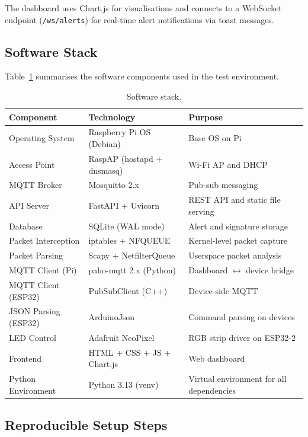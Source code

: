 \documentclass[12pt,a4paper]{article}
\begin{document}
The dashboard uses Chart.js for visualisations and connects to a WebSocket endpoint (\texttt{/ws/alerts}) for real-time alert notifications via toast messages.

\subsection{Software Stack}
\label{sec:software_stack}

Table~\ref{tab:software} summarises the software components used in the test environment.

\begin{table}[H]
\centering
\caption{Software stack.}
\label{tab:software}
\begin{tabular}{llp{5cm}}
\toprule
\textbf{Component} & \textbf{Technology} & \textbf{Purpose} \\
\midrule
Operating System    & Raspberry Pi OS (Debian) & Base OS on Pi \\
Access Point        & RaspAP (hostapd + dnsmasq) & Wi-Fi AP and DHCP \\
MQTT Broker         & Mosquitto 2.x            & Pub-sub messaging \\
API Server          & FastAPI + Uvicorn         & REST API and static file serving \\
Database            & SQLite (WAL mode)         & Alert and signature storage \\
Packet Interception & iptables + NFQUEUE        & Kernel-level packet capture \\
Packet Parsing      & Scapy + NetfilterQueue    & Userspace packet analysis \\
MQTT Client (Pi)    & paho-mqtt 2.x (Python)    & Dashboard $\leftrightarrow$ device bridge \\
MQTT Client (ESP32) & PubSubClient (C++)        & Device-side MQTT \\
JSON Parsing (ESP32)& ArduinoJson              & Command parsing on devices \\
LED Control         & Adafruit NeoPixel         & RGB strip driver on ESP32-2 \\
Frontend            & HTML + CSS + JS + Chart.js & Web dashboard \\
Python Environment  & Python 3.13 (venv)        & Virtual environment for all dependencies \\
\bottomrule
\end{tabular}
\end{table}

\subsection{Reproducible Setup Steps}
\label{sec:env_steps}
\end{document}
